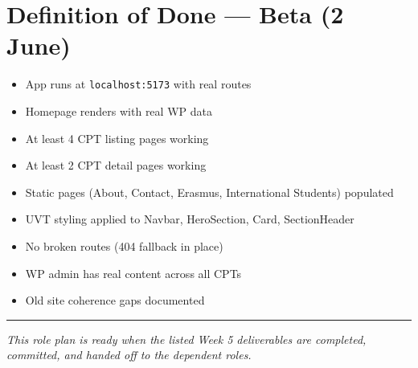 \documentclass[11pt,a4paper]{article}
\begin{document}
\section{Definition of Done — Beta (2 June)}

\begin{itemize}
\item[$\square$] App runs at \nolinkurl{localhost:5173} with real routes
\item[$\square$] Homepage renders with real WP data
\item[$\square$] At least 4 CPT listing pages working
\item[$\square$] At least 2 CPT detail pages working
\item[$\square$] Static pages (About, Contact, Erasmus, International Students) populated
\item[$\square$] UVT styling applied to Navbar, HeroSection, Card, SectionHeader
\item[$\square$] No broken routes (404 fallback in place)
\item[$\square$] WP admin has real content across all CPTs
\item[$\square$] Old site coherence gaps documented
\end{itemize}
\vspace{1.2em}
\textcolor{uvtYellow}{\rule{\linewidth}{1.5pt}}

{\small\textit{This role plan is ready when the listed Week 5 deliverables are completed, committed, and handed off to the dependent roles.}}
\end{document}

